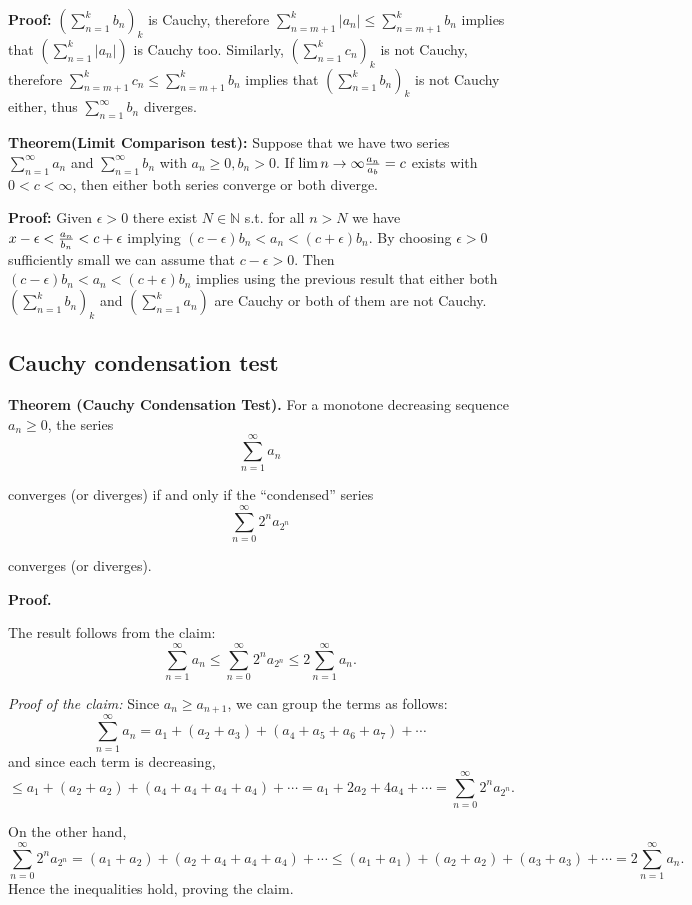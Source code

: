 \documentclass{article}
\begin{document}
\textbf{Proof:} $(\sum_{n=1}^{k}{b_n})_k$ is Cauchy, therefore $\sum_{n=m+1}^{k}{|a_n|}\leq \sum_{n=m+1}^{k}{b_n}$ implies that $(\sum_{n=1}^{k}{|a_n|})$ is Cauchy too. 
Similarly, $(\sum_{n=1}^{k}{c_n})_k$ is not Cauchy, therefore $\sum_{n=m+1}^{k}{c_n}\leq \sum_{n=m+1}^{k}{b_n}$ implies that $(\sum_{n=1}^{k}{b_n})_k$ is not Cauchy either, thus $\sum_{n=1}^{\infty}{b_n}$ diverges.

\textbf{Theorem(Limit Comparison test):} Suppose that we have two series $\sum_{n=1}^{\infty}{a_n}$ and $\sum_{n=1}^{\infty}{b_n}$ with $a_n\geq 0, b_n > 0$. If $\lim{n\to \infty}{a_n\over a_b}=c$ exists with $0<c<\infty$, then either both series converge or both diverge.

\textbf{Proof:} Given $\epsilon > 0$ there exist $N\in \mathbb{N}$ s.t. for all $n>N$ we have $x-\epsilon <{a_n\over b_n} < c + \epsilon$ implying $(c-\epsilon)b_n<a_n<(c+\epsilon)b_n$. By choosing $\epsilon>0$ sufficiently small we can assume that $c-\epsilon >0$. Then $(c-\epsilon)b_n<a_n<(c+\epsilon)b_n$ implies using the previous result that either both $(\sum_{n=1}^{k}{b_n})_k$ and $(\sum_{n=1}^{k}{a_n})$ are Cauchy or both of them are not Cauchy.

\subsection{Cauchy condensation test}
\textbf{Theorem (Cauchy Condensation Test).}
For a monotone decreasing sequence \( a_n \ge 0 \), the series 
\[
\sum_{n=1}^{\infty} a_n
\]

converges (or diverges) if and only if the “condensed” series
\[
\sum_{n=0}^{\infty} 2^n a_{2^n}
\]

converges (or diverges).

\textbf{Proof.}

The result follows from the claim:
\[
\sum_{n=1}^{\infty} a_n 
\le 
\sum_{n=0}^{\infty} 2^n a_{2^n}
\le 
2\sum_{n=1}^{\infty} a_n.
\]

\textit{Proof of the claim:}
Since \( a_n \ge a_{n+1} \), we can group the terms as follows:
\[
\sum_{n=1}^{\infty} a_n 
= a_1 + (a_2 + a_3) + (a_4 + a_5 + a_6 + a_7) + \cdots
\]
and since each term is decreasing,
\[
\le a_1 + (a_2 + a_2) + (a_4 + a_4 + a_4 + a_4) + \cdots
= a_1 + 2a_2 + 4a_4 + \cdots
= \sum_{n=0}^{\infty} 2^n a_{2^n}.
\]

On the other hand,
\[
\sum_{n=0}^{\infty} 2^n a_{2^n}
= (a_1 + a_2) + (a_2 + a_4 + a_4 + a_4) + \cdots
\le (a_1 + a_1) + (a_2 + a_2) + (a_3 + a_3) + \cdots
= 2\sum_{n=1}^{\infty} a_n.
\]
Hence the inequalities hold, proving the claim.
\end{document}

